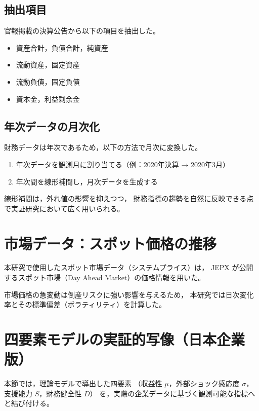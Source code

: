 \subsection{抽出項目}

官報掲載の決算公告から以下の項目を抽出した。

\begin{itemize}
\item 資産合計，負債合計，純資産
\item 流動資産，固定資産
\item 流動負債，固定負債
\item 資本金，利益剰余金
\end{itemize}

\subsection{年次データの月次化}

財務データは年次であるため，以下の方法で月次に変換した。

\begin{enumerate}
\item 年次データを観測月に割り当てる（例：2020年決算 → 2020年3月）
\item 年次間を線形補間し，月次データを生成する
\end{enumerate}

線形補間は，外れ値の影響を抑えつつ，
財務指標の趨勢を自然に反映できる点で実証研究において広く用いられる。

\section{市場データ：スポット価格の推移}

本研究で使用したスポット市場データ（システムプライス）は，
JEPX が公開するスポット市場（Day Ahead Market）の価格情報を用いた。

市場価格の急変動は倒産リスクに強い影響を与えるため，
本研究では日次変化率とその標準偏差（ボラティリティ）を計算した。

\section{四要素モデルの実証的写像（日本企業版）}

本節では，理論モデルで導出した四要素
（収益性 $\mu$，外部ショック感応度 $\sigma$，支援能力 $S$，財務健全性 $D$）
を，実際の企業データに基づく観測可能な指標へと結び付ける。

